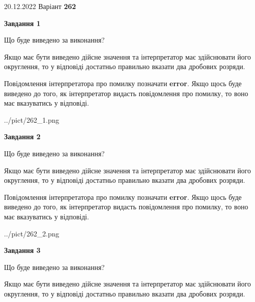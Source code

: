 \documentclass[12pt, ukrainian]{article}
\begin{document}
{20.12.2022 Варіант \No \textbf { 262 }\par}
{
\begin {Large}

{\begin {center}\textbf{Завдання 1}\end {center}}\par
Що буде виведено за виконання? \par

Якщо має бути виведено дійсне значення та інтерпретатор має здійснювати його округлення, 
то у відповіді достатньо правильно вказати два дробових розряди.

Повідомлення інтерпретатора про помилку позначати \textbf{error}.
Якщо щось буде виведено до того, як інтерпретатор видасть повідомлення про помилку, 
то воно має вказуватись у відповіді. \par

\begin{center}
	{../pict/262_1.png}
\end{center}
\newpage

{\begin {center}\textbf{Завдання 2}\end {center}}\par
Що буде виведено за виконання? \par

Якщо має бути виведено дійсне значення та інтерпретатор має здійснювати його округлення, 
то у відповіді достатньо правильно вказати два дробових розряди.

Повідомлення інтерпретатора про помилку позначати \textbf{error}.
Якщо щось буде виведено до того, як інтерпретатор видасть повідомлення про помилку, 
то воно має вказуватись у відповіді. \par

\begin{center}
	{../pict/262_2.png}
\end{center}
\newpage

{\begin {center}\textbf{Завдання 3}\end {center}}\par
Що буде виведено за виконання? \par

Якщо має бути виведено дійсне значення та інтерпретатор має здійснювати його округлення, 
то у відповіді достатньо правильно вказати два дробових розряди.


\end{Large}}
\end{document}
